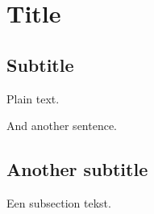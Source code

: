 \documentclass{book}
\begin{document}
\section{Title}

\subsection{Subtitle}

Plain text.

And another sentence.

\subsection{Another subtitle}

Een subsection tekst.
\end{document}
